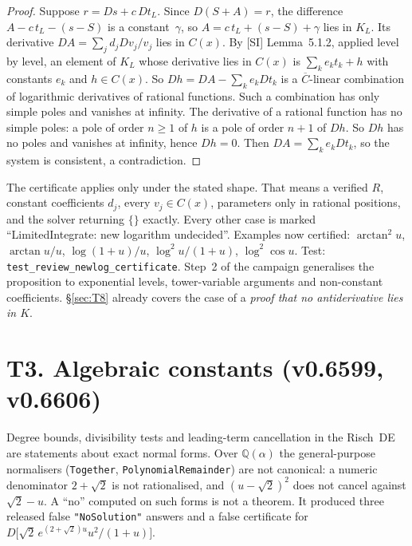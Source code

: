 \documentclass[11pt]{article}
\theoremstyle{definition}
\theoremstyle{remark}
\newcommand{\Q}{\mathbb{Q}}
\newcommand{\code}[1]{\texttt{#1}}
\begin{document}
\begin{proof}
Suppose $r=Ds+c\,Dt_L$. Since $D(S+A)=r$, the difference $A-c\,t_L-(s-S)$ is a
constant~$\gamma$, so $A=c\,t_L+(s-S)+\gamma$ lies in $K_L$. Its derivative
$DA=\sum_jd_jDv_j/v_j$ lies in $C(x)$. By [SI] Lemma~5.1.2, applied level by level, an
element of $K_L$ whose derivative lies in $C(x)$ is $\sum_ke_kt_k+h$ with constants
$e_k$ and $h\in C(x)$. So $Dh=DA-\sum_ke_kDt_k$ is a $\overline C$-linear combination
of logarithmic derivatives of rational functions. Such a combination has only simple
poles and vanishes at infinity. The derivative of a rational function has no simple
poles: a pole of order $n\ge1$ of $h$ is a pole of order $n+1$ of $Dh$. So $Dh$ has no
poles and vanishes at infinity, hence $Dh=0$. Then $DA=\sum_ke_kDt_k$, so the system is
consistent, a contradiction.
\end{proof}

The certificate applies only under the stated shape. That means a verified $R$, constant
coefficients $d_j$, every $v_j\in C(x)$, parameters only in rational positions, and the
solver returning $\{\}$ exactly. Every other case is marked
``LimitedIntegrate: new logarithm undecided''. Examples now certified: $\arctan^2u$,
$\arctan u/u$, $\log(1+u)/u$, $\log^2u/(1+u)$, $\log^2\cos u$.
Test: \code{test\_review\_newlog\_certificate}. Step~2 of the campaign generalises the
proposition to exponential levels, tower-variable arguments and non-constant
coefficients. \S\ref{sec:T8} already covers the case of a \emph{proof that no
antiderivative lies in $K$}.

\section*{T3. Algebraic constants (v0.6599, v0.6606)}

Degree bounds, divisibility tests and leading-term cancellation in the Risch~DE are
statements about exact normal forms. Over $\Q(\alpha)$ the general-purpose normalisers
(\code{Together}, \code{PolynomialRemainder}) are not canonical: a numeric denominator
$2+\sqrt2$ is not rationalised, and $(u-\sqrt2)^2$ does not cancel against
$\sqrt2-u$. A ``no'' computed on such forms is not a theorem. It produced three
released false \code{"NoSolution"} answers and a false certificate for
$D\bigl[\sqrt2\,e^{(2+\sqrt2)u}u^2/(1+u)\bigr]$.
\end{document}

